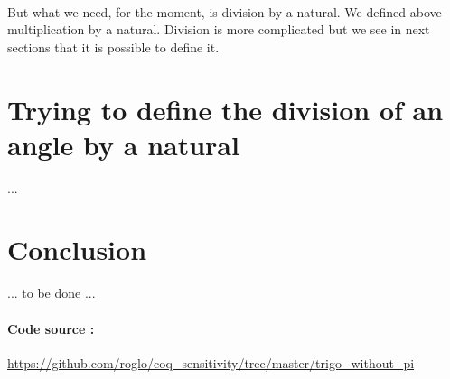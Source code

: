 \documentclass[11pt]{article}
\theoremstyle{definition}
\begin{document}
\

\noindent But what we need, for the moment, is division by a
natural. We defined above multiplication by a natural. Division is
more complicated but we see in next sections that it is possible to
define it.

\section{Trying to define the division of an angle by a natural}

...

\section{Conclusion}

... to be done ...

\paragraph{Code source :}
\url{https://github.com/roglo/coq_sensitivity/tree/master/trigo_without_pi}
\end{document}
